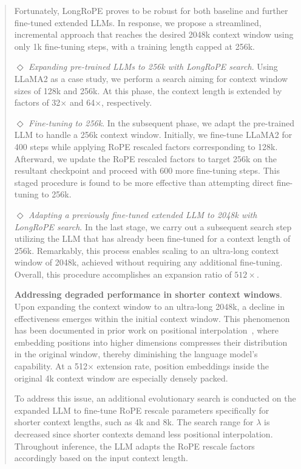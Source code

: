 \begin{abstract}
Fortunately, LongRoPE proves to be robust for both baseline and further fine-tuned extended LLMs. In response, we propose a streamlined, incremental approach that reaches the desired 2048k context window using only 1k fine-tuning steps, with a training length capped at 256k.

$\Diamond$ \textit{Expanding pre-trained LLMs to 256k with LongRoPE search}. Using LLaMA2 as a case study, we perform a search aiming for context window sizes of 128k and 256k. At this phase, the context length is extended by factors of 32$\times$ and 64$\times$, respectively.

$\Diamond$ \textit{Fine-tuning to 256k}. In the subsequent phase, we adapt the pre-trained LLM to handle a 256k context window. Initially, we fine-tune LLaMA2 for 400 steps while applying RoPE rescaled factors corresponding to 128k. Afterward, we update the RoPE rescaled factors to target 256k on the resultant checkpoint and proceed with 600 more fine-tuning steps. This staged procedure is found to be more effective than attempting direct fine-tuning to 256k.

$\Diamond$ \textit{Adapting a previously fine-tuned extended LLM to 2048k with LongRoPE search}. In the last stage, we carry out a subsequent search step utilizing the LLM that has already been fine-tuned for a context length of 256k. Remarkably, this process enables scaling to an ultra-long context window of 2048k, achieved without requiring any additional fine-tuning. Overall, this procedure accomplishes an expansion ratio of $512\times$.

\textbf{Addressing degraded performance in shorter context windows}. Upon expanding the context window to an ultra-long 2048k, a decline in effectiveness emerges within the initial context window. This phenomenon has been documented in prior work on positional interpolation~\cite{pi}, where embedding positions into higher dimensions compresses their distribution in the original window, thereby diminishing the language model's capability. At a 512$\times$ extension rate, position embeddings inside the original 4k context window are especially densely packed.

To address this issue, an additional evolutionary search is conducted on the expanded LLM to fine-tune RoPE rescale parameters specifically for shorter context lengths, such as 4k and 8k. The search range for $\lambda$ is decreased since shorter contexts demand less positional interpolation. Throughout inference, the LLM adapts the RoPE rescale factors accordingly based on the input context length.


\end{abstract}
